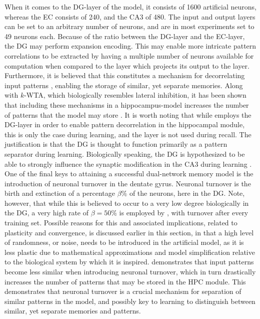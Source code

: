 When it comes to the DG-layer of the model, it consists of 1600 artificial neurons, whereas the EC consists of 240, and the CA3 of 480. The input and output layers can be set to an arbitrary number of neurons, and are in most experiments set to 49 neurons each. Because of the ratio between the DG-layer and the EC-layer, the DG may perform expansion encoding. This may enable more intricate pattern correlations to be extracted by having a multiple number of neurons available for computation when compared to the layer which projects its output to the layer. Furthermore, it is believed that this constitutes a mechanism for decorrelating input patterns \citep{Rolls1998chpt2}, enabling the storage of similar, yet separate memories. Along with $k$-WTA, which biologically resembles lateral inhibition, it has been shown that including these mechanisms in a hippocampus-model increases the number of patterns that the model may store \citep{Wakagi2008, Hattori2014}. It is worth noting that while \cite{Hattori2014} employs the DG-layer in order to enable pattern decorrelation in the hippocampal module, this is only the case during learning, and the layer is not used during recall. The justification is that the DG is thought to function primarily as a pattern separator during learning. Biologically speaking, the DG is hypothesized to be able to strongly influence the synaptic modification in the CA3 during learning \citep{Rolls1998chpt6}.
One of the final keys to attaining a successful dual-network memory model is the introduction of neuronal turnover in the dentate gyrus. Neuronal turnover is the birth and extinction of a percentage $\beta \%$ of the neurons, here in the DG. Note, however, that while this is believed to occur to a very low degree biologically in the DG, a very high rate of $\beta = 50 \%$ is employed by \cite{Hattori2014}, with turnover after every training set. Possible reasons for this and associated implications, related to plasticity and convergence, is discussed earlier in this section, in that a high level of randomness, or noise, needs to be introduced in the artificial model, as it is less plastic due to mathematical approximations and model simplification relative to the biological system by which it is inspired. \cite{Hattori2014} demonstrates that input patterns become less similar when introducing neuronal turnover, which in turn drastically increases the number of patterns that may be stored in the HPC module. This demonstrates that neuronal turnover is a crucial mechanism for separation of similar patterns in the model, and possibly key to learning to distinguish between similar, yet separate memories and patterns.

